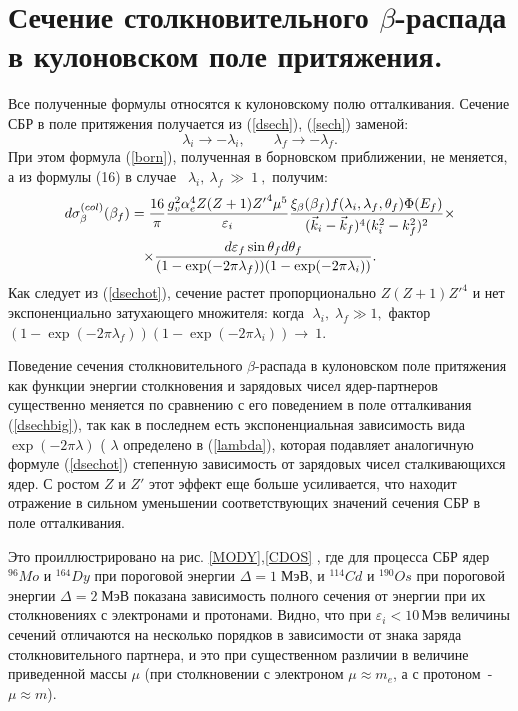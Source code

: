 

\section{Сечение столкновительного $\beta$-распада в кулоновском поле
притяжения.}

Все полученные формулы относятся к кулоновскому полю отталкивания. Сечение
СБР в поле притяжения получается из (\ref{dsech}), (\ref{sech}) заменой:
$$
\lambda_i{\rightarrow} {-} \lambda_i,\qquad  \lambda_f{\rightarrow} {-} \lambda_f.
$$
При этом формула (\ref{born}), полученная в борновском приближении, не меняется,
а из формулы (16) в случае
$ \;~ \lambda_i,~ \lambda_f~ \gg~ 1~,$ получим:
\begin{multline}\label{dsechot}
d \sigma^{(col)}_\beta(\beta_f)=
{16  \over \pi}{{g^2_v \alpha_e^4Z (Z+1){Z'}^4\mu^5}
\over \varepsilon_i}{\xi_\beta(\beta_f) f(\lambda_i,\lambda_f,\theta_f)
\Phi(E_f)
\over{(\vec k_i-\vec k_f)^4(k^2_i-k^2_f)^2}}
\times\\
\times
{{d\varepsilon_f\sin \theta_f d\theta_f}\over{(1-\exp(-2\pi\lambda_f))
(1-\exp(-2\pi\lambda_i))}}.
\end{multline}
Как следует из (\ref{dsechot}), сечение растет пропорционально $Z (Z+1){Z'}^4$ и нет
экспоненциально затухающего множителя:  когда
$ \; \lambda_i,\; \lambda_f \gg 1,$ фактор
$(1-\exp(-2\pi\lambda_f))(1-\exp(-2\pi\lambda_i))\rightarrow~ 1$.

Поведение сечения столкновительного $\beta$-распада в кулоновском поле
притяжения как функции энергии столкновения и зарядовых чисел ядер-партнеров
существенно меняется по сравнению с его поведением в поле отталкивания
(\ref{dsechbig}), так как
в последнем есть экспоненциальная зависимость вида
$\exp( - 2\pi \lambda)$ ( $\lambda $ определено в (\ref{lambda}), которая
подавляет аналогичную формуле (\ref{dsechot}) степенную зависимость
от зарядовых чисел сталкивающихся ядер. С ростом $Z$ и $Z'$ этот эффект
еще больше усиливается, что находит отражение в сильном уменьшении
соответствующих значений сечения СБР  в поле отталкивания.

Это проиллюстрировано на рис. \ref{MODY},\ref{CDOS} , где для процесса СБР ядер $^{96}Mo$ и $^{164}Dy$
при пороговой энергии $\Delta=1\; МэВ$, и  $^{114}Cd$ и $^{190}Os$ при пороговой энергии $\Delta=2\; МэВ$
показана зависимость полного сечения от энергии при их столкновениях с электронами
и протонами. Видно, что при $\varepsilon_i<10\,Мэв$ величины сечений
отличаются на несколько порядков в зависимости от знака заряда столкновительного
партнера, и это при существенном различии в величине приведенной массы $\mu$
(при столкновении с электроном $\mu\approx m_e$, а с протоном~-~$\mu\approx m$).

